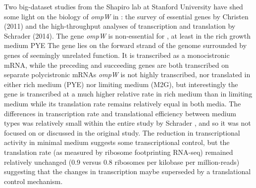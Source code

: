 Two big-dataset studies from the Shapiro lab at Stanford University have shed some light on the biology of \textit{ompW} in \caulobacter: the survey of essential genes by Christen \etal (2011) and the high-throughput analyses of transcription and translation by Schrader \etal (2014). The gene \textit{ompW} is non-essential for \caulobacter, at least in the rich growth medium \ac{PYE} The gene lies on the forward strand of the genome surrounded by genes of seemingly unrelated function. It is transcribed as a monocistronic mRNA, while the preceding and succeeding genes are both transcribed on separate polycistronic mRNAs \textit{ompW} is not highly transcribed, nor translated in either rich medium (\ac{PYE}) nor limiting medium (M2G), but interestingly the gene is transcribed at a much higher relative rate in rich medium than in limiting medium while its translation rate remains relatively equal in both media. The differences in transcription rate and translational efficiency between medium types was relatively small within the entire study by Schrader \etal, and so it was not focused on or discussed in the original study. The reduction in transcriptional activity in minimal medium suggests some transcriptional control, but the translation rate (as measured by ribosome footprinting RNA-seq) remained relatively unchanged (0.9 versus 0.8 ribosomes per kilobase per million-reads) suggesting that the changes in transcription maybe superseded by a translational control mechanism.

